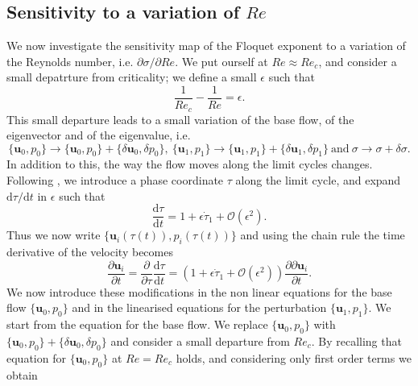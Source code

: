 \subsection{Sensitivity to a variation of $Re$}

We now investigate the sensitivity map of the Floquet exponent to a variation of the Reynolds number, i.e. $\partial \sigma/\partial Re$.
%
We put ourself at $Re \approx Re_c$, and consider a small depatrture from criticality; we define a small $\epsilon$ such that
%
\begin{equation}
  \frac{1}{Re_c} - \frac{1}{Re} = \epsilon.
\end{equation}
%
This small departure leads to a small variation of the base flow, of the eigenvector and of the eigenvalue, i.e.
%
\begin{equation}
  \{ \bm{u}_0, p_0 \} \rightarrow \{ \bm{u}_0, p_0 \} + \{\delta \bm{u}_0,\delta p_0\}, \ \{ \bm{u}_1, p_1 \} \rightarrow \{ \bm{u}_1, p_1 \}  + \{\delta \bm{u}_1,\delta p_1\}\ \text{and} \ \sigma \rightarrow \sigma + \delta \sigma.
\end{equation}
%
In addition to this, the way the flow moves along the limit cycles changes. Following \cite{}, we introduce a phase coordinate $\tau$ along the limit cycle, and expand $\text{d}\tau/\text{d}t$ in $\epsilon$ such that
%
\begin{equation}
  \frac{\text{d} \tau}{\text{d} t} = 1 + \epsilon \dot{\tau}_1 +  \mathcal{O}(\epsilon^2).
\end{equation}
%
Thus we now write $\{\bm{u}_i(\tau(t)),p_i(\tau(t))\}$ and using the chain rule the time derivative of the velocity becomes
%
\begin{equation}
  \frac{\partial \bm{u}_i}{\partial t} = \frac{\partial}{\partial \tau} \frac{\text{d} \tau}{\text{d} t} = ( 1 + \epsilon \dot{\tau}_1 + \mathcal{O}(\epsilon^2)) \frac{\partial \partial \bm{u}_i}{\partial t}.
\end{equation} 
%
We now introduce these modifications in the non linear equations for the base flow $\{\bm{u}_0,p_0\}$ and in the linearised equations for the perturbation $\{\bm{u}_1,p_1\}$.
%
We start from the equation for the base flow. We replace $\{\bm{u}_0,p_0\}$ with $\{\bm{u}_0,p_0\} + \{\delta \bm{u}_0,\delta p_0\}$ and consider a small departure from $Re_c$. By recalling that equation for $\{\bm{u}_0,p_0\}$ at $Re=Re_c$ holds, and considering only first order terms we obtain
%
